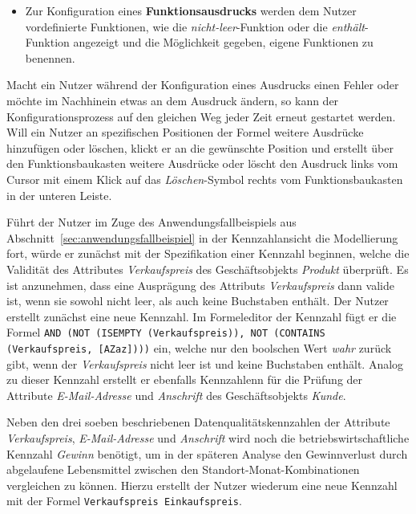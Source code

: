 \documentclass[
  language=german, %
  type=bachelor,%
  ngerman
]{isthesis}
\begin{document}
\begin{content}
\begin{itemize}
    \item Zur Konfiguration eines \textbf{Funktionsausdrucks} werden dem Nutzer
      vordefinierte Funktionen, wie \zB{} die \textit{nicht-leer}-Funktion oder
      die \textit{enthält}-Funktion angezeigt und die Möglichkeit gegeben,
      eigene Funktionen zu benennen.
  \end{itemize}

  Macht ein Nutzer während der Konfiguration eines Ausdrucks einen Fehler oder
  möchte im Nachhinein etwas an dem Ausdruck ändern, so kann der
  Konfigurationsprozess auf den gleichen Weg jeder Zeit erneut gestartet werden.  Will ein
  Nutzer an spezifischen Positionen der Formel weitere Ausdrücke hinzufügen
  oder löschen, klickt er an die gewünschte Position und erstellt über den
  Funktionsbaukasten weitere Ausdrücke oder löscht den Ausdruck links vom Cursor
  mit einem Klick auf das \textit{Löschen}-Symbol rechts vom Funktionsbaukasten
  in der unteren Leiste.

  Führt der Nutzer im Zuge des Anwendungsfallbeispiels aus
  Abschnitt~\ref{sec:anwendungsfallbeispiel} in der Kennzahlansicht die
  Modellierung fort, würde er zunächst mit der Spezifikation einer Kennzahl
  beginnen, welche die Validität des Attributes \textit{Verkaufspreis} des
  Geschäftsobjekts \textit{Produkt} überprüft. Es ist anzunehmen, dass eine
  Ausprägung des Attributs \textit{Verkaufspreis} dann valide ist, wenn sie
  sowohl nicht leer, als auch keine Buchstaben enthält. Der Nutzer erstellt
  zunächst eine neue Kennzahl. Im Formeleditor der Kennzahl fügt er die Formel
  \texttt{AND (NOT (ISEMPTY (Verkaufspreis)), NOT (CONTAINS (Verkaufspreis,
  [A\textminus{}Za\textminus{}z])))} ein, welche nur den boolschen Wert
  \textit{wahr} zurück gibt, wenn der \textit{Verkaufspreis} nicht leer ist und
  keine Buchstaben enthält. Analog zu dieser Kennzahl erstellt er ebenfalls
  Kennzahlenn für die Prüfung der Attribute \textit{E-Mail-Adresse} und
  \textit{Anschrift} des Geschäftsobjekts \textit{Kunde}.

  Neben den drei soeben beschriebenen Datenqualitätskennzahlen der Attribute
  \textit{Verkaufspreis}, \textit{E-Mail-Adresse} und \textit{Anschrift} wird
  noch die betriebswirtschaftliche Kennzahl \textit{Gewinn} benötigt, um in der
  späteren Analyse den Gewinnverlust durch abgelaufene Lebensmittel zwischen
  den Standort-Monat-Kombinationen vergleichen zu können. Hierzu erstellt der
  Nutzer wiederum eine neue Kennzahl mit der Formel \texttt{Verkaufspreis \textminus{}
  Einkaufspreis}.



\end{content}
\end{document}
